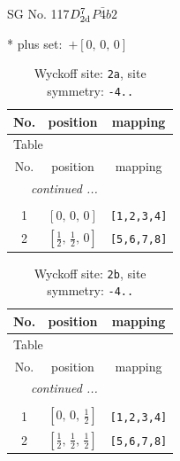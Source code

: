 \documentclass[fleqn,8pt]{jsarticle}
\begin{document}
\setcounter{MaxMatrixCols}{32}

\renewcommand{\tablename}{Table~}
\renewcommand{\figurename}{Figure~}
\begin{center}
\LARGE
SG No. 117\quad$D_{\rm 2d}^{7}$\quad$P\bar{4}b2$\quad[ tetragonal ]
\end{center}
* plus set:\,\,\,$+\left[ 0,\, 0,\, 0 \right]$
\renewcommand{\arraystretch}{1.2}
\begin{longtable}{ccc}
\caption{Wyckoff site: {\tt 2a}, site symmetry: {\tt -4..}}
 \\
 \hline \hline
No. & position & mapping \\ \hline \endfirsthead

\multicolumn{2}{l}{\tablename\ \thetable{}} \\
 \hline \hline
No. & position & mapping \\ \hline \endhead

 \hline \hline
\multicolumn{2}{r}{\footnotesize\it continued ...} \\ \endfoot

 \hline \hline
\multicolumn{2}{r}{} \\ \endlastfoot

1 & $\left[ 0,\, 0,\, 0 \right]$ & {\tt [1,2,3,4]} \\ \hline
2 & $\left[ \frac{1}{2},\, \frac{1}{2},\, 0 \right]$ & {\tt [5,6,7,8]} \\
\end{longtable}
\renewcommand{\arraystretch}{1.2}
\begin{longtable}{ccc}
\caption{Wyckoff site: {\tt 2b}, site symmetry: {\tt -4..}}
 \\
 \hline \hline
No. & position & mapping \\ \hline \endfirsthead

\multicolumn{2}{l}{\tablename\ \thetable{}} \\
 \hline \hline
No. & position & mapping \\ \hline \endhead

 \hline \hline
\multicolumn{2}{r}{\footnotesize\it continued ...} \\ \endfoot

 \hline \hline
\multicolumn{2}{r}{} \\ \endlastfoot

1 & $\left[ 0,\, 0,\, \frac{1}{2} \right]$ & {\tt [1,2,3,4]} \\ \hline
2 & $\left[ \frac{1}{2},\, \frac{1}{2},\, \frac{1}{2} \right]$ & {\tt [5,6,7,8]} \\
\end{longtable}
\end{document}
